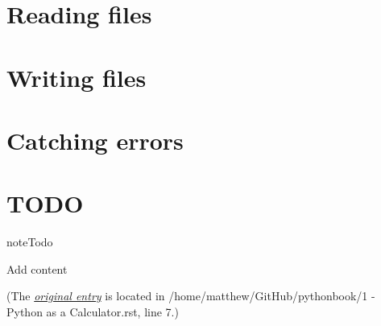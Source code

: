 \documentclass[letterpaper,10pt,english]{sphinxmanual}
\begin{document}
\chapter{Reading files}
\label{19 - Reading files:reading-files}\label{19 - Reading files::doc}

\chapter{Writing files}
\label{20 - Writing files:writing-files}\label{20 - Writing files::doc}

\chapter{Catching errors}
\label{21 - Catching errors:catching-errors}\label{21 - Catching errors::doc}

\chapter{TODO}
\label{todo:todo}\label{todo::doc}
\begin{notice}{note}{Todo}

Add content
\end{notice}

(The {\hyperref[1 - Python as a Calculator:index-0]{\emph{original entry}}} is located in  /home/matthew/GitHub/pythonbook/1 - Python as a Calculator.rst, line 7.)



\renewcommand{\indexname}{Index}
\printindex
\end{document}

